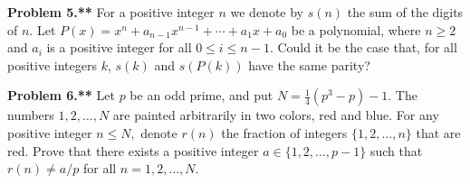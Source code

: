 \documentclass[12pt]{article}
\begin{document}
\textbf{Problem 5.**} For a positive integer $n$ we denote by $s(n)$ the sum of the digits of $n$. Let $P(x)=x^n+a_{n-1}x^{n-1}+\cdots+a_1x+a_0$ be a polynomial, where $n \geqslant 2$ and $a_i$ is a positive integer for all $0 \leqslant i \leqslant n-1$. Could it be the case that, for all positive integers $k$, $s(k)$ and $s(P(k))$ have the same parity?

\textbf{Problem 6.**} Let $p$ be an odd prime, and put $N=\frac{1}{4} (p^3 -p) -1.$ The numbers $1,2, \dots, N$ are painted arbitrarily in two colors, red and blue. For any positive integer $n \leqslant N,$ denote $r(n)$ the fraction of integers $\{ 1,2, \dots, n \}$ that are red.
Prove that there exists a positive integer $a \in \{ 1,2, \dots, p-1\}$ such that $r(n) \neq a/p$ for all $n = 1,2, \dots , N.$
\end{document}
